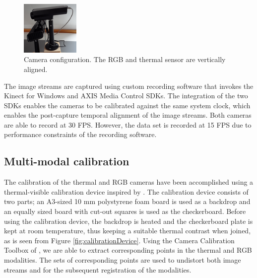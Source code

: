 \documentclass[10pt,twocolumn,letterpaper]{article}
\begin{document}
\begin{figure}[htpb]
	\centering
		\includegraphics[width=0.25\textwidth]{pictures/camerasetup.jpg}
	\caption{Camera configuration. The RGB and thermal sensor are vertically aligned.}
	\label{fig:camerasetup}
\end{figure}

The image streams are captured using custom recording software that invokes the Kinect for Windows and AXIS Media Control SDKs. The integration of the two SDKs enables the cameras to be calibrated against the same system clock, which enables the post-capture temporal alignment of the image streams. Both cameras are able to record at 30 FPS. However, the data set is recorded at 15 FPS due to performance constraints of the recording software. 

\subsection{Multi-modal calibration}
The calibration of the thermal and RGB cameras have been accomplished using a thermal-visible calibration device inspired by \cite{vidas2012mask}. The calibration device consists of two parts; an A3-sized 10 mm polystyrene foam board is used as a backdrop and an equally sized board with cut-out squares is used as the checkerboard. Before using the calibration device, the backdrop is heated and the checkerboard plate is kept at room temperature, thus keeping a suitable thermal contrast when joined, as is seen from Figure \ref{fig:calibrationDevice}. %
Using the Camera Calibration Toolbox of \cite{bouguet2004camera}, we are able to extract corresponding points in the thermal and RGB modalities. The sets of corresponding points are used to undistort both image streams and for the subsequent registration of the modalities. 
\end{document}
